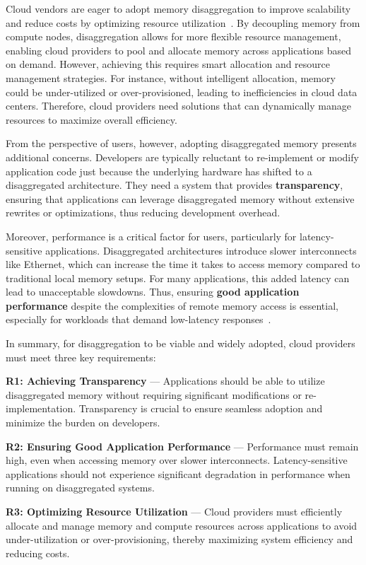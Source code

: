 Cloud vendors are eager to adopt memory disaggregation to improve scalability and reduce costs by optimizing resource utilization~\cite{pond, tpp}. By decoupling memory from compute nodes, disaggregation allows for more flexible resource management, enabling cloud providers to pool and allocate memory across applications based on demand. However, achieving this requires smart allocation and resource management strategies. For instance, without intelligent allocation, memory could be under-utilized or over-provisioned, leading to inefficiencies in cloud data centers. Therefore, cloud providers need solutions that can dynamically manage resources to maximize overall efficiency.

From the perspective of users, however, adopting disaggregated memory presents additional concerns. Developers are typically reluctant to re-implement or modify application code just because the underlying hardware has shifted to a disaggregated architecture. They need a system that provides \textbf{transparency}, ensuring that applications can leverage disaggregated memory without extensive rewrites or optimizations, thus reducing development overhead.

Moreover, performance is a critical factor for users, particularly for latency-sensitive applications. Disaggregated architectures introduce slower interconnects like Ethernet, which can increase the time it takes to access memory compared to traditional local memory setups. For many applications, this added latency can lead to unacceptable slowdowns. Thus, ensuring \textbf{good application performance} despite the complexities of remote memory access is essential, especially for workloads that demand low-latency responses~\cite{mind, chase}.

In summary, for disaggregation to be viable and widely adopted, cloud providers must meet three key requirements:

\textbf{R1: Achieving Transparency} — Applications should be able to utilize disaggregated memory without requiring significant modifications or re-implementation. Transparency is crucial to ensure seamless adoption and minimize the burden on developers.

\textbf{R2: Ensuring Good Application Performance} — Performance must remain high, even when accessing memory over slower interconnects. Latency-sensitive applications should not experience significant degradation in performance when running on disaggregated systems.

\textbf{R3: Optimizing Resource Utilization} — Cloud providers must efficiently allocate and manage memory and compute resources across applications to avoid under-utilization or over-provisioning, thereby maximizing system efficiency and reducing costs.


